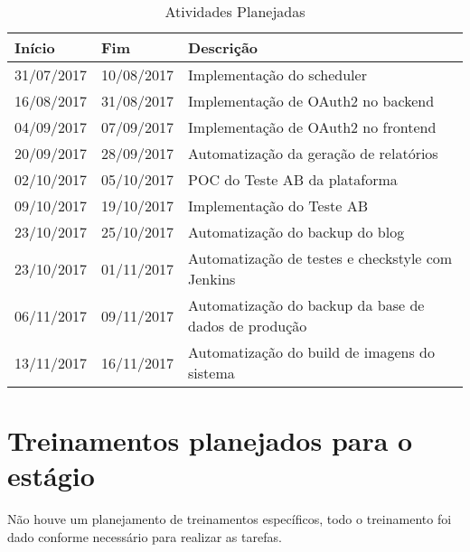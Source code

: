 \begin{table}[H]
\begin{center}
\caption[Atividades Planejadas]
{Atividades Planejadas}\label{tab:tabPlan}

\begin{tabular}{llp{7cm}} \hline

\hline
\textbf{Início}    & \textbf{Fim} &  \textbf{Descrição}                             \\
\hline
31/07/2017        & 10/08/2017      & Implementação do \gls{scheduler}\\
16/08/2017        & 31/08/2017      & Implementação de \gls{OAuth2} no \gls{backend}\\
04/09/2017        & 07/09/2017      & Implementação de \gls{OAuth2} no \gls{frontend}\\
20/09/2017        & 28/09/2017      & Automatização da geração de relatórios\\
02/10/2017        & 05/10/2017      & \gls{POC} do \gls{Teste AB} da plataforma\\
09/10/2017        & 19/10/2017      & Implementação do \gls{Teste AB}\\
23/10/2017        & 25/10/2017      & Automatização do backup do blog\\
23/10/2017        & 01/11/2017      & Automatização de testes e \gls{checkstyle} com \gls{Jenkins}\\
06/11/2017        & 09/11/2017      & Automatização do backup da base de dados de produção\\
13/11/2017        & 16/11/2017      & Automatização do build de imagens do sistema\\
\hline

\hline
\end{tabular}
\end{center}
\end{table}

\section{Treinamentos planejados para o estágio}

Não houve um planejamento de treinamentos específicos, todo o treinamento foi dado conforme necessário para realizar as tarefas.\\

